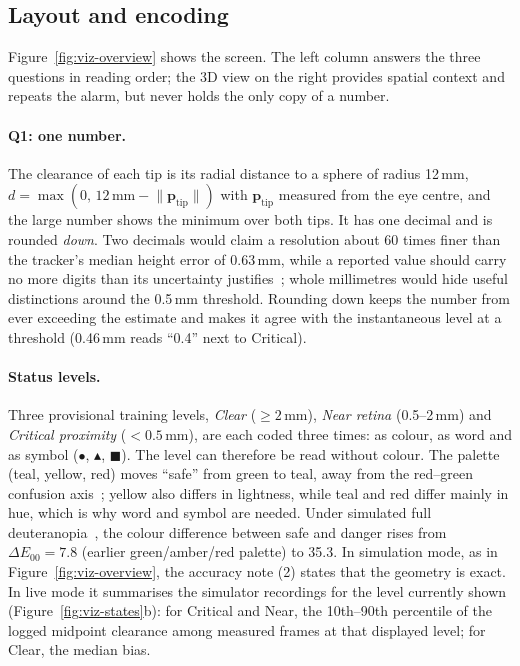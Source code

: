 \subsection{Layout and encoding}\label{sec:viz-layout}

Figure~\ref{fig:viz-overview} shows the screen. The left column answers the three
questions in reading order; the 3D view on the right provides spatial context and
repeats the alarm, but never holds the only copy of a number.

\paragraph{Q1: one number.} The clearance of each tip is its radial distance to a
sphere of radius 12\,mm, $d = \max(0,\,12\,\text{mm} - \lVert\mathbf{p}_\text{tip}\rVert)$
with $\mathbf{p}_\text{tip}$ measured from the eye centre, and the large number shows the minimum over both tips. It has one decimal and is rounded \emph{down}. Two decimals would
claim a resolution about 60 times finer than the tracker's median height error of
0.63\,mm, while a reported value should carry no more digits than its
uncertainty justifies~\cite{gum2008}; whole millimetres would hide useful distinctions around the 0.5\,mm
threshold. Rounding down keeps the number from ever
exceeding the estimate and makes it agree with the instantaneous level at a
threshold (0.46\,mm reads ``0.4'' next to Critical).

\paragraph{Status levels.} Three provisional training
levels, \emph{Clear} ($\geq 2$\,mm), \emph{Near retina} (0.5--2\,mm) and
\emph{Critical proximity} ($< 0.5$\,mm), are each coded three times: as colour,
as word and as symbol ($\bullet$, $\blacktriangle$, $\blacksquare$). The level can
therefore be read without colour. The palette (teal, yellow, red) moves ``safe'' from green to teal,
away from the red--green confusion axis~\cite{wong2011}; yellow also differs in
lightness, while teal and red differ mainly in hue, which is why word and symbol
are needed. Under simulated full
deuteranopia~\cite{machado2009}, the colour difference between safe and danger
rises from $\Delta E_{00} = 7.8$ (earlier green/amber/red palette) to 35.3. In simulation mode, as in Figure~\ref{fig:viz-overview}, the
accuracy note (2) states that the geometry is exact. In live mode it summarises
the simulator recordings for the level currently shown (Figure~\ref{fig:viz-states}b): for
Critical and Near, the 10th--90th percentile of the logged midpoint clearance
among measured frames at that displayed level; for Clear, the median bias.

